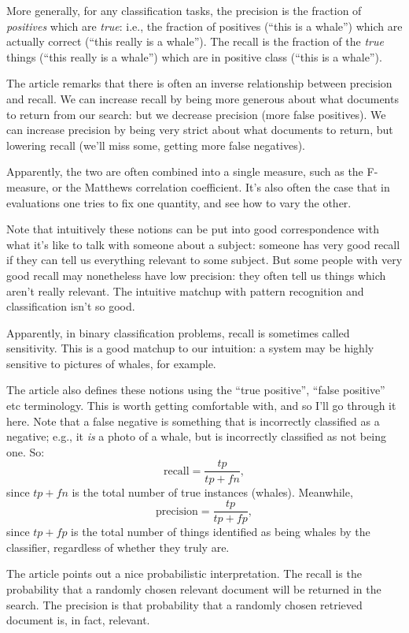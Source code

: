 More generally, for any classification tasks, the precision is the
fraction of \emph{positives} which are \emph{true}: i.e., the fraction
of positives (``this is a whale'') which are actually correct (``this
really is a whale'').  The recall is the fraction of the \emph{true}
things (``this really is a whale'') which are in positive class
(``this is a whale'').

The article remarks that there is often an inverse relationship
between precision and recall. We can increase recall by being more
generous about what documents to return from our search: but we
decrease precision (more false positives).  We can increase precision
by being very strict about what documents to return, but lowering
recall (we'll miss some, getting more false negatives).

Apparently, the two are often combined into a single measure, such as
the F-measure, or the Matthews correlation coefficient.  It's also
often the case that in evaluations one tries to fix one quantity, and
see how to vary the other.

Note that intuitively these notions can be put into good
correspondence with what it's like to talk with someone about a
subject: someone has very good recall if they can tell us everything
relevant to some subject.  But some people with very good recall may
nonetheless have low precision: they often tell us things which aren't
really relevant.  The intuitive matchup with pattern recognition and
classification isn't so good.

Apparently, in binary classification problems, recall is sometimes
called sensitivity.  This is a good matchup to our intuition: a system
may be highly sensitive to pictures of whales, for example.

The article also defines these notions using the ``true positive'',
``false positive'' etc terminology.  This is worth getting comfortable
with, and so I'll go through it here.  Note that a false negative is
something that is incorrectly classified as a negative; e.g., it
\emph{is} a photo of a whale, but is incorrectly classified as not
being one.  So:
$$
\mbox{recall} = \frac{tp}{tp+fn}, 
$$ 
since $tp+fn$ is the total number of true instances (whales).
Meanwhile,
$$
\mbox{precision} = \frac{tp}{tp+fp},
$$
since $tp+fp$ is the total number of things identified as being whales
by the classifier, regardless of whether they truly are.

The article points out a nice probabilistic interpretation.  The
recall is the probability that a randomly chosen relevant document
will be returned in the search.  The precision is that probability
that a randomly chosen retrieved document is, in fact, relevant.

